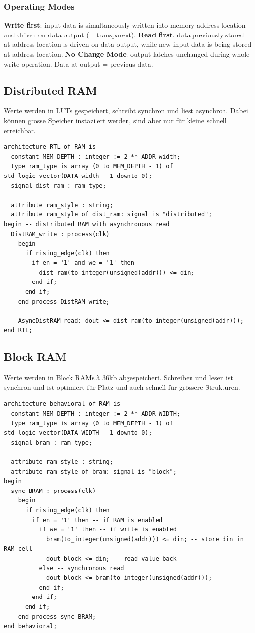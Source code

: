 \subsubsection{Operating Modes}
\textbf{Write first}: input data is simultaneously written into memory address location and driven on data output (= transparent).
\textbf{Read first}: data previously stored at address location is driven on data output, while new input data is being stored at address location.
\textbf{No Change Mode}: output latches unchanged during whole write operation. Data at output = previous data.

\subsection{Distributed RAM}
Werte werden in LUTs gespeichert, schreibt synchron und liest asynchron. Dabei können grosse Speicher instaziiert werden, sind aber nur für kleine schnell erreichbar.
\begin{lstlisting}
architecture RTL of RAM is
  constant MEM_DEPTH : integer := 2 ** ADDR_width;
  type ram_type is array (0 to MEM_DEPTH - 1) of std_logic_vector(DATA_width - 1 downto 0);
  signal dist_ram : ram_type;
  
  attribute ram_style : string;
  attribute ram_style of dist_ram: signal is "distributed";
begin -- distributed RAM with asynchronous read
  DistRAM_write : process(clk)
    begin
      if rising_edge(clk) then
        if en = '1' and we = '1' then
	      dist_ram(to_integer(unsigned(addr))) <= din;
	    end if;
	  end if;
	end process DistRAM_write;
	
	AsyncDistRAM_read: dout <= dist_ram(to_integer(unsigned(addr)));
end RTL;
\end{lstlisting}

\subsection{Block RAM}
Werte werden in Block RAMs à 36kb abgespeichert. Schreiben und lesen ist synchron und ist optimiert für Platz und auch schnell für grössere Strukturen.

\begin{lstlisting}
architecture behavioral of RAM is
  constant MEM_DEPTH : integer := 2 ** ADDR_WIDTH;
  type ram_type is array (0 to MEM_DEPTH - 1) of std_logic_vector(DATA_WIDTH - 1 downto 0);
  signal bram : ram_type;

  attribute ram_style : string;
  attribute ram_style of bram: signal is "block";
begin
  sync_BRAM : process(clk)
    begin
      if rising_edge(clk) then
        if en = '1' then -- if RAM is enabled
          if we = '1' then -- if write is enabled
            bram(to_integer(unsigned(addr))) <= din; -- store din in RAM cell
            dout_block <= din; -- read value back
          else -- synchronous read
            dout_block <= bram(to_integer(unsigned(addr)));
          end if;
        end if;
      end if;
    end process sync_BRAM;
end behavioral;
\end{lstlisting}

